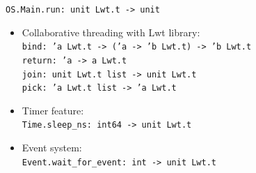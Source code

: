 \documentclass[10pt]{beamer}
\begin{document}
\begin{frame}{\texttt{OS.Main.run: unit Lwt.t -> unit}}
\begin{itemize}
\item Collaborative threading with Lwt library: \\ 
\texttt{bind: 'a Lwt.t -> ('a -> 'b Lwt.t) -> 'b Lwt.t} \\ 
\texttt{return: 'a -> a Lwt.t} \\
\texttt{join: unit Lwt.t list -> unit Lwt.t} \\
\texttt{pick: 'a Lwt.t list -> 'a Lwt.t}
\item Timer feature: \\ \texttt{Time.sleep\_ns: int64 -> unit Lwt.t}
\item Event system: \\ \texttt{Event.wait\_for\_event: int -> unit Lwt.t}
\end{itemize}
\end{frame}
\end{document}
